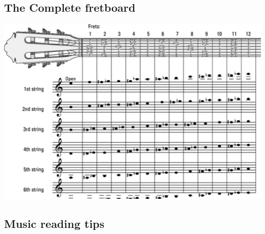 \documentclass[11pt]{article}
\begin{document}
\subsection*{The Complete fretboard}
\label{sec:org5695760}
\begin{center}
\includegraphics[width=.9\linewidth]{./Handouts.org_20240214_213412.png}
\end{center}
\subsection*{Music reading tips}
\label{sec:orgd193fd3}
\end{document}
